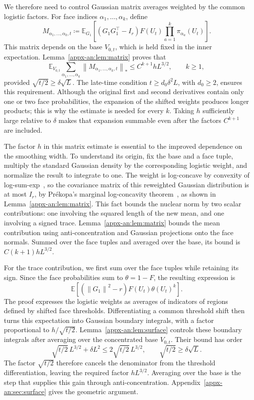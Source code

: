 \documentclass[11pt,letterpaper]{article}
\theoremstyle{remark}
\newcommand{\E}{\mathbb E}
\newcommand{\norm}[1]{\left\lVert#1\right\rVert}
\begin{document}
We therefore need to control Gaussian matrix averages weighted by
the common logistic factors. For face indices
\(\alpha_1,\ldots,\alpha_k\), define
\[
 M_{\alpha_1,\ldots,\alpha_k,t}\coloneqq
 \E_{G_1}\!\left[
 (G_1G_1^\top-I_r)F(U_t)\prod_{a=1}^k\pi_{\alpha_a}(U_t)
 \right].
\]
This matrix depends on the base \(V_{0,t}\), which is held fixed in
the inner expectation. Lemma~\ref{appx-an:lem:matrix} proves that
\[
 \E_{V_{0,t}}\sum_{\alpha_1,\ldots,\alpha_k}
 \norm{M_{\alpha_1,\ldots,\alpha_k,t}}_*
 \le C^{k+1}hL^{3/2},\qquad k\ge1,
\]
provided \(\sqrt{t/2}\ge\delta\sqrt L\). The late-time condition
\(t\ge d_0\delta^2L\), with \(d_0\ge2\), ensures this requirement.
Although the original first and second derivatives contain only
one or two face probabilities, the expansion of the shifted weights
produces longer products; this is why the estimate is needed for
every \(k\). Taking \(h\) sufficiently large relative to \(\delta\)
makes that expansion summable even after the factors \(C^{k+1}\)
are included.

The factor \(h\) in this matrix estimate is essential to the improved
dependence on the smoothing width. To understand its origin, fix the
base and a face tuple, multiply the standard Gaussian density by the
corresponding logistic weight, and normalize the result to integrate
to one. The weight is log-concave by convexity of
log-sum-exp~\cite[Section~3.1.5, pp.~72--74]{BoydVandenberghe2004},
so the covariance matrix of this
reweighted Gaussian distribution is at most \(I_r\), by
Pr\'ekopa's marginal log-concavity theorem~\cite[Theorem~6]{Prekopa1973},
as shown in Lemma~\ref{appx-an:lem:matrix}. This fact bounds
the nuclear norm by two scalar contributions: one involving the
squared length of the new mean, and one involving a signed trace.
Lemma~\ref{appx-an:lem:matrix} bounds the mean contribution using
anti-concentration and Gaussian projections onto the face normals.
Summed over the face tuples and averaged over the base, its bound
is \(C(k+1)hL^{3/2}\).

For the trace contribution, we first sum over the face tuples while
retaining its sign. Since the face probabilities sum to
\(\theta=1-F\), the resulting expression is
\[
 \E\!\left[(\norm{G_1}^2-r)F(U_t)\theta(U_t)^k\right].
\]
The proof expresses the logistic weights as averages of indicators
of regions defined by shifted face thresholds. Differentiating a
common threshold shift then turns this expectation into Gaussian
boundary integrals, with a factor proportional to \(h/\sqrt{t/2}\).
Lemma~\ref{appx-an:lem:surface} controls these boundary integrals
after averaging over the concentrated base \(V_{0,t}\). Their bound
has order
\[
 \sqrt{t/2}\,L^{3/2}+\delta L^2
 \le2\sqrt{t/2}\,L^{3/2},
 \qquad\sqrt{t/2}\ge\delta\sqrt L.
\]
The factor \(\sqrt{t/2}\) therefore cancels the denominator from
the threshold differentiation, leaving the required factor
\(hL^{3/2}\). Averaging over the base is the step that supplies this
gain through anti-concentration.
Appendix~\ref{appx-an:sec:surface} gives the geometric argument.
\end{document}
